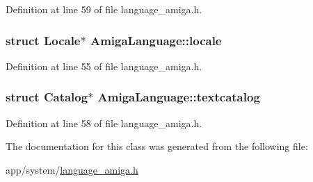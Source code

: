 Definition at line 59 of file language\+\_\+amiga.\+h.

\subsubsection[{\texorpdfstring{locale}{locale}}]{\setlength{\rightskip}{0pt plus 5cm}struct Locale$\ast$ Amiga\+Language\+::locale\hspace{0.3cm}{\ttfamily [private]}}\hypertarget{classAmigaLanguage_aa2f016a7aba24dcc49f1324cc6c9e3d9}{}\label{classAmigaLanguage_aa2f016a7aba24dcc49f1324cc6c9e3d9}


Definition at line 55 of file language\+\_\+amiga.\+h.

\subsubsection[{\texorpdfstring{textcatalog}{textcatalog}}]{\setlength{\rightskip}{0pt plus 5cm}struct Catalog$\ast$ Amiga\+Language\+::textcatalog\hspace{0.3cm}{\ttfamily [private]}}\hypertarget{classAmigaLanguage_a7f97521ba5db06192872ab72125ed0a4}{}\label{classAmigaLanguage_a7f97521ba5db06192872ab72125ed0a4}


Definition at line 58 of file language\+\_\+amiga.\+h.



The documentation for this class was generated from the following file\+:\begin{DoxyCompactItemize}
\item 
app/system/\hyperlink{language__amiga_8h}{language\+\_\+amiga.\+h}\end{DoxyCompactItemize}
